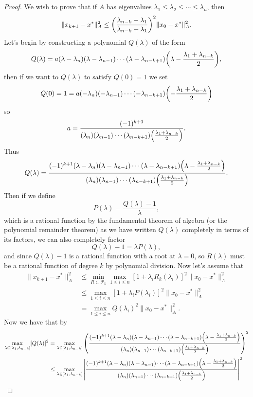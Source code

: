 \documentclass[12pt]{report}
\begin{document}
\begin{problem}
\begin{proof}
We wish to prove that if $A$ has eigenvalues $\lambda_1 \leq \lambda_2 \leq \cdots \leq \lambda_n$, then
\[
      \|x_{k+1} - x^* \|_A^2 \leq {\left(\frac{\lambda_{n-k}-\lambda_1}{\lambda_{n-k} + \lambda_1}\right)}^2 \|x_{0} - x^* \|_A^2.
\]
Let's begin by constructing a polynomial $Q(\lambda)$ of the form
\[
      Q(\lambda) = a(\lambda - \lambda_n)(\lambda - \lambda_{n-1})\cdots(\lambda - \lambda_{n-k+1}){\left(\lambda - \frac{\lambda_1 + \lambda_{n-k}}{2}\right)},
\]
then if we want to $Q(\lambda)$ to satisfy $Q(0)=1$ we set
\[
      Q(0) = 1 = a(- \lambda_n)( - \lambda_{n-1})\cdots( - \lambda_{n-k+1}){\left( - \frac{\lambda_1 + \lambda_{n-k}}{2}\right)}
\]
so
\[
      a = \frac{(-1)^{k+1}}{(\lambda_n)( \lambda_{n-1})\cdots(\lambda_{n-k+1}){\left(\frac{\lambda_1 + \lambda_{n-k}}{2}\right)}}.
\]
Thus
\[
      Q(\lambda) = \frac{(-1)^{k+1}(\lambda - \lambda_n)(\lambda - \lambda_{n-1})\cdots(\lambda - \lambda_{n-k+1}){\left(\lambda - \frac{\lambda_1 + \lambda_{n-k}}{2}\right)}}{(\lambda_n)( \lambda_{n-1})\cdots(\lambda_{n-k+1}){\left(\frac{\lambda_1 + \lambda_{n-k}}{2}\right)}}.
\]
Then if we define
\[
     P(\lambda) = \frac{Q(\lambda) - 1}{\lambda},
\]
which is a rational function by the fundamental theorem of algebra (or the polynomial remainder theorem) as we have written $Q(\lambda)$ completely in terms of its factors, we can also completely factor
\[
      Q(\lambda) - 1 = \lambda P(\lambda),
\]
and since $Q(\lambda) - 1$ is a rational function with a root at $\lambda = 0$, so $R(\lambda)$ must be a rational function of degree $k$ by polynomial division. Now let's assume that
\begin{align} \label{bi boi}
     \|x_{k+1} - x^*\|_A^2 &\leq \min_{R \subset \mathcal{P}_k}\max_{1\leq i \leq n}[1 + \lambda_i R_k(\lambda_i)]^2\|x_0 - x^*\|_A^2 \nonumber \\ 
     &\leq \max_{1\leq i \leq n}[1 + \lambda_i P(\lambda_i)]^2\|x_0 - x^*\|_A^2 \nonumber \\ 
     &= \max_{1 \leq i \leq n}Q(\lambda_i)^2\|x_0 - x^*\|_A^2. 
\end{align}
Now we have that by 
\begin{align*}
     \max_{\lambda \in [\lambda_1,\lambda_{n-k}]}[Q(\lambda)]^2 &= \max_{\lambda \in [\lambda_1,\lambda_{n-k}]}\paren{\frac{(-1)^{k+1}(\lambda - \lambda_n)(\lambda - \lambda_{n-1})\cdots(\lambda - \lambda_{n-k+1})\paren{\lambda - \frac{\lambda_1 + \lambda_{n-k}}{2}}}{(\lambda_n)( \lambda_{n-1})\cdots(\lambda_{n-k+1})\paren{\frac{\lambda_1 + \lambda_{n-k}}{2}}}}^2\\
     &\leq\max_{\lambda \in [\lambda_1,\lambda_{n-k}]}\abs{\frac{(-1)^{k+1}(\lambda - \lambda_n)(\lambda - \lambda_{n-1})\cdots(\lambda - \lambda_{n-k+1})\paren{\lambda - \frac{\lambda_1 + \lambda_{n-k}}{2}}}{(\lambda_n)( \lambda_{n-1})\cdots(\lambda_{n-k+1})\paren{\frac{\lambda_1 + \lambda_{n-k}}{2}}}}^2\\

\end{align*}
\end{proof}
\end{problem}
\end{document}
